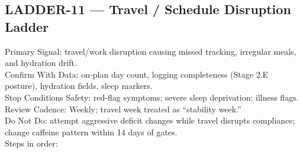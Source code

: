 \documentclass[10pt]{article}
\begin{document}
\newpage

\subsection*{LADDER-11 — Travel / Schedule Disruption Ladder}
{}

Primary Signal: travel/work disruption causing missed tracking, irregular meals, and hydration drift.\\
Confirm With Data: on-plan day count, logging completeness (Stage 2.E posture), hydration fields, sleep markers.\\
Stop Conditions Safety: red-flag symptoms; severe sleep deprivation; illness flags.\\
Review Cadence: Weekly; travel week treated as “stability week.”\\
Do Not Do: attempt aggressive deficit changes while travel disrupts compliance; change caffeine pattern within 14 days of gates.\\
Steps in order:
\end{document}
